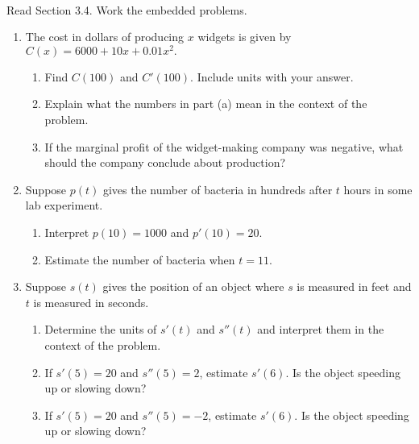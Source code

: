 \documentclass[11pt,fleqn]{article}
\begin{document}
\renewcommand{\headrulewidth}{0pt}
\newcommand{\blank}[1]{\rule{#1}{0.75pt}}
\newcommand{\bc}{\begin{center}}
\newcommand{\ec}{\end{center}}
\renewcommand{\d}{\displaystyle}

\vspace*{-0.7in}

\begin{center}
  \large
  \\
\end{center}
Read Section 3.4. Work the embedded problems. \\
\begin{enumerate}
\item The cost in dollars of producing $x$ widgets is given by $C(x)=6000+10x+0.01x^2.$
	\begin{enumerate}
	\item Find $C(100)$ and $C'(100).$ Include units with your answer.
	\vfill
	\item Explain what the numbers in part (a) mean in the context of the problem.
	\vfill
	\item If the marginal profit of the widget-making company was negative, what should the company conclude about production?
	\vfill
	\end{enumerate}
\item Suppose $p(t)$ gives the number of bacteria in hundreds after $t$ hours in some lab experiment. 
	\begin{enumerate}
	\item  Interpret $p(10)=1000$ and $p'(10)=20.$
	\vfill
	\item Estimate the number of bacteria when $t=11.$
	\vfill
	\end{enumerate}
\item Suppose $s(t)$ gives the position of an object where $s$ is measured in feet and $t$ is measured in seconds.\\
	\begin{enumerate}
	\item  Determine the units of $s'(t)$ and $s''(t)$ and interpret them in the context of the problem.
	\vfill
	\item If $s'(5)=20$ and $s''(5)=2$, estimate $s'(6).$ Is the object speeding up or slowing down?
	\vfill
	\item If $s'(5)=20$ and $s''(5)=-2$, estimate $s'(6).$ Is the object speeding up or slowing down?
	\vfill
	\end{enumerate}

\end{enumerate}
\end{document}

